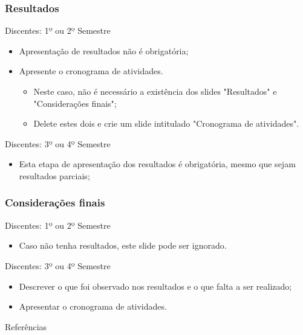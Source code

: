 \documentclass[aspectratio=169]{beamer}
\begin{document}
\begin{frame}
\frametitle{Resultados}

\begin{block}{Discentes: 1º ou 2º Semestre \cite{teste}}
    \begin{itemize}
        \item Apresentação de resultados não é obrigatória;
        \item Apresente o cronograma de atividades.
        \begin{itemize}
            \item Neste caso, não é necessário a existência dos slides "Resultados" e "Considerações finais";
            \item Delete estes dois e crie um slide intitulado "Cronograma de atividades".
        \end{itemize}
    \end{itemize}
\end{block}

\begin{block}{Discentes: 3º ou 4º Semestre \cite{teste}}
    \begin{itemize}
        \item Esta etapa de apresentação dos resultados é obrigatória, mesmo que sejam resultados parciais;
    \end{itemize}
\end{block}

\end{frame}

\begin{frame}
\frametitle{Considerações finais}

\begin{block}{Discentes: 1º ou 2º Semestre \cite{teste}}
    \begin{itemize}
        \item Caso não tenha resultados, este slide pode ser ignorado.
    \end{itemize}
\end{block}

\begin{block}{Discentes: 3º ou 4º Semestre \cite{teste}}
    \begin{itemize}
        \item Descrever o que foi observado nos resultados e o que falta a ser realizado;
        \item Apresentar o cronograma de atividades.
    \end{itemize}
\end{block}

\end{frame}

\begin{frame}[allowframebreaks]{Referências}
	
\end{frame}
\end{document}
